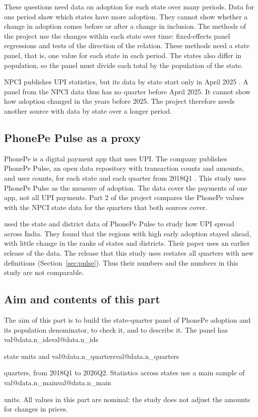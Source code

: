 \documentclass[11pt,a4paper]{article}
\makeatletter
\newcommand{\val}[1]{\ifcsname val@#1\endcsname\csname val@#1\endcsname\else
  \PackageError{study}{Unknown value key `#1'}{Run Rscript src/R/part1_study.R}\fi}
\makeatother
\begin{document}
These questions need data on adoption for each state over many periods. Data for one period show which states have more adoption. They cannot show whether a change in adoption comes before or after a change in inclusion. The methods of the project use the changes within each state over time: fixed-effects panel regressions and tests of the direction of the relation. These methods need a state panel, that is, one value for each state in each period. The states also differ in population, so the panel must divide each total by the population of the state.

NPCI publishes UPI statistics, but its data by state start only in April 2025 \citep{npci_upi_state, medianama2025npci}. A panel from the NPCI data thus has no quarter before April 2025. It cannot show how adoption changed in the years before 2025. The project therefore needs another source with data by state over a longer period.

\subsection{PhonePe Pulse as a proxy}
PhonePe is a digital payment app that uses UPI. The company publishes PhonePe Pulse, an open data repository with transaction counts and amounts, and user counts, for each state and each quarter from 2018Q1 \citep{phonepe_pulse}. This study uses PhonePe Pulse as the measure of adoption. The data cover the payments of one app, not all UPI payments. Part 2 of the project compares the PhonePe values with the NPCI state data for the quarters that both sources cover.

\citet{reddy2024icrier} used the state and district data of PhonePe Pulse to study how UPI spread across India. They found that the regions with high early adoption stayed ahead, with little change in the ranks of states and districts. Their paper uses an earlier release of the data. The release that this study uses restates all quarters with new definitions (Section~\ref{sec:pulse}). Thus their numbers and the numbers in this study are not comparable.

\subsection{Aim and contents of this part}
The aim of this part is to build the state-quarter panel of PhonePe adoption and its population denominator, to check it, and to describe it. The panel has \val{data.n_ids} state units and \val{data.n_quarters} quarters, from 2018Q1 to 2026Q2. Statistics across states use a main sample of \val{data.n_main} units. All values in this part are nominal: the study does not adjust the amounts for changes in prices.
\end{document}

